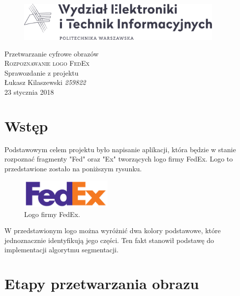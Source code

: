 \documentclass[12pt, oneside, final]{report}
\begin{document}
\begin{titlepage}
	\centering
	\begin{figure}
		\centering
		\includegraphics[width=0.9\textwidth]{logo.pdf}
	\end{figure}
	\vspace*{100pt}
	\LARGE{Przetwarzanie cyfrowe obrazów}\\
	\vspace{30pt}
	\textsc{\Huge{Rozpoznawanie logo FedEx}}\\
	\vspace{10pt}
	\large{Sprawozdanie z projektu}\\
	\vspace{120pt}
	\Large{Łukasz Kilaszewski \textit{259822}}\\
	\vfill
	\large{23 stycznia 2018}
\end{titlepage}

\thispagestyle{empty}

\section*{Wstęp}
Podstawowym celem projektu było napisanie aplikacji, która będzie w stanie rozpoznać fragmenty "Fed" oraz "Ex" tworzących logo firmy FedEx. Logo to przedstawione zostało na poniższym rysunku.
\begin{figure}[ht!]
	\centering
	\includegraphics[width=0.4\textwidth]{images/logo.jpg}
	\caption{Logo firmy FedEx.}
\end{figure}

W przedstawionym logo można wyróżnić dwa kolory podstawowe, które jednoznacznie identyfikują jego części. Ten fakt stanowił podstawę do implementacji algorytmu segmentacji.

\section*{Etapy przetwarzania obrazu}
\end{document}
